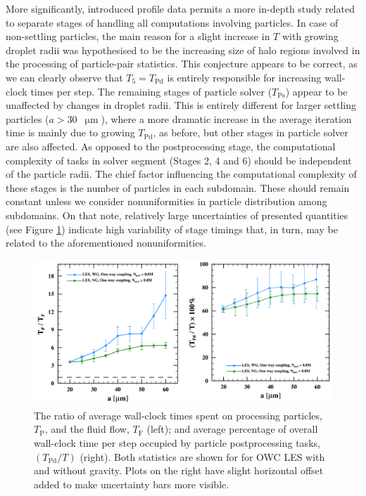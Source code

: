 \documentclass{pracamgren}
\begin{document}
More significantly, introduced profile data permits a more in-depth study related to separate stages of handling all computations involving particles.
In case of non-settling particles, the main reason for a slight increase in $T$ with growing droplet radii was hypothesised to be the increasing size of halo regions involved in the processing of particle-pair statistics.
This conjecture appears to be correct, as we can clearly observe that $T_5 = T_{\text{Pd}}$ is entirely responsible for increasing wall-clock times per step.
The remaining stages of particle solver ($T_{\text{Ps}}$) appear to be unaffected by changes in droplet radii.
This is entirely different for larger settling particles ($a > 30$~$\upmu\text{m}$), where a more dramatic increase in the average iteration time is mainly due to growing $T_{\text{Pd}}$, as before, but other stages in particle solver are also affected.
As opposed to the postprocessing stage, the computational complexity of tasks in solver segment (Stages 2, 4 and 6) should be independent of the particle radii.
The chief factor influencing the computational complexity of these stages is the number of particles in each subdomain.
These should remain constant unless we consider nonuniformities in particle distribution among subdomains.
On that note, relatively large uncertainties of presented quantities (see Figure \ref{fig:pffowclesex}) indicate high variability of stage timings that, in turn, may be related to the aforementioned nonuniformities.

\begin{figure}[ht]
\centering
\includegraphics[width=13.5cm]{figures/3-07_pffowclesex.pdf}
\caption{
The ratio of average wall-clock times spent on processing particles, $T_{\text{P}}$, and the fluid flow, $T_{\text{F}}$ (left); and average percentage of overall wall-clock time per step occupied by particle postprocessing tasks, $(T_{\text{Pd}} / T)$ (right).
Both statistics are shown for for OWC LES with and without gravity.
Plots on the right have slight horizontal offset added to make uncertainty bars more visible.
}
\label{fig:pffowclesex}
\end{figure}
\end{document}
